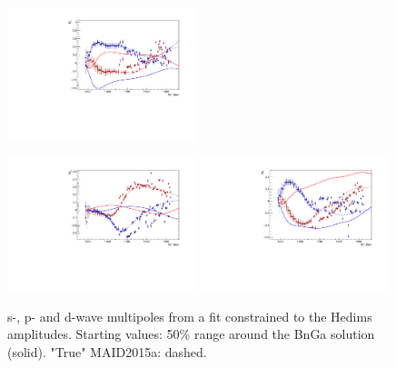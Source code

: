 \documentclass[a4paper,12pt]{report}
\begin{document}
\begin{figure}
\begin{center}
{    \includegraphics[width=0.49\textwidth]{BnGa/Hedim/plots.0/E2m.pdf}
    }
    \centerline{
    \includegraphics[width=0.49\textwidth]{BnGa/Hedim/plots.0/M2p.pdf}
    \includegraphics[width=0.49\textwidth]{BnGa/Hedim/plots.0/M2m.pdf}
    }
    \caption{s-, p- and d-wave multipoles from a fit constrained to the Hedims amplitudes. 
    Starting values: 50\% range around the BnGa solution (solid). "True" MAID2015a: dashed.}
\label{Fig:const5}
  \end{center}
\end{figure}
\end{document}
